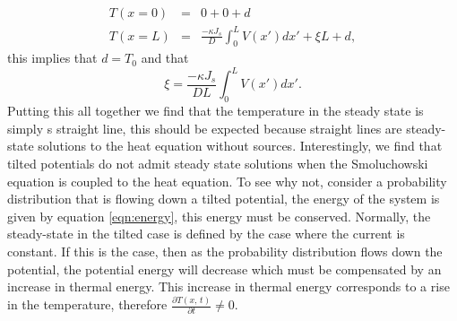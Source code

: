 \begin{eqnarray}
T(x = 0) &=& 0 + 0 + d \\
T(x = L) &=& \frac{-\kappa J_s}{D} \int_0^L V(x') dx' + \xi L + d,
\end{eqnarray}
this implies that $d = T_0$ and that
\begin{equation}
\xi = \frac{-\kappa J_s}{D L} \int_0^L V(x') dx'.
\end{equation}
Putting this all together we find that the temperature in the steady state is simply s straight line, this should be expected because straight lines are steady-state solutions to the heat equation without sources. Interestingly, we find that tilted potentials do not admit steady state solutions when the Smoluchowski equation is coupled to the heat equation. To see why not, consider a probability distribution that is flowing down a tilted potential, the energy of the system is given by equation \ref{eqn:energy}, this energy must be conserved. Normally, the steady-state in the tilted case is defined by the case where the current is constant. If this is the case, then as the probability distribution flows down the potential, the potential energy will decrease which must be compensated by an increase in thermal energy. This increase in thermal energy corresponds to a rise in the temperature, therefore $\frac{\partial T(x, \, t)}{\partial t} \ne 0$. 

